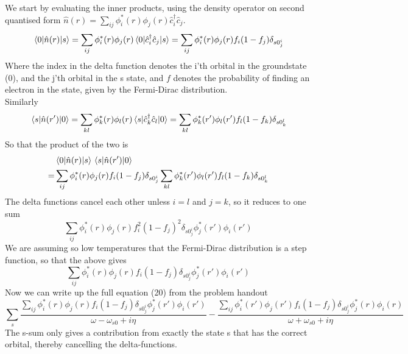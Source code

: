 \begin{solution}
We start by evaluating the inner products, using the density operator on second quantised form $\hat{n}(r) = \sum_{ij} \phi_i^*(r)\phi_j(r)\hat{c}_i^{\dagger}\hat{c}_j$.
\begin{equation}
    \mel{0}{\hat{n}(r)}{s} = \sum_{ij}\phi_i^*(r)\phi_j(r) \mel{0}{\hat{c}_i^{\dagger} \hat{c}_j}{s} =  \sum_{ij}\phi_i^*(r)\phi_j(r) f_i(1-f_j) \delta_{s0_j^i}
\end{equation}
Where the index in the delta function denotes the i'th orbital in the groundstate (0), and the j'th orbital in the s state, and
$f$ denotes the probability of finding an electron in the state, given by the Fermi-Dirac distribution. \\
Similarly
\begin{equation}
    \mel{s}{\hat{n}(r')}{0} = \sum_{kl}\phi_k^*(r)\phi_l(r) \mel{s}{\hat{c}_k^{\dagger} \hat{c}_l}{0} = \sum_{kl} \phi_k^*(r') \phi_l(r') f_l(1-f_k) \delta_{s0_k^l}
\end{equation}
So that the product of the two is
\begin{equation}
\begin{split}
        & \mel{0}{\hat{n}(r)}{s}\mel{s}{\hat{n}(r')}{0} \\
        = & \sum_{ij}\phi_i^*(r)\phi_j(r) f_i(1-f_j) \delta_{s0_j^i} \sum_{kl} \phi_k^*(r') \phi_l(r') f_l(1-f_k) \delta_{s0_k^l}
\end{split}
\end{equation}
The delta functions cancel each other unless $i=l$ and $j=k$, so it reduces to one sum
\begin{equation}
    \sum_{ij} \phi_i^*(r)\phi_j(r) f_i^2(1-f_j)^2 \delta_{s0_j^i} \phi_j^*(r') \phi_i(r') 
\end{equation}
We are assuming so low temperatures that the Fermi-Dirac distribution is a step function, so that the above gives
\begin{equation}
        \sum_{ij} \phi_i^*(r)\phi_j(r) f_i(1-f_j) \delta_{s0_j^i} \phi_j^*(r') \phi_i(r') 
\end{equation}
Now we can write up the full equation (20) from the problem handout
\begin{equation}
    \sum_s \frac{\sum_{ij} \phi_i^*(r)\phi_j(r) f_i(1-f_j) \delta_{s0_j^i} \phi_j^*(r') \phi_i(r') }{\omega - \omega_{s0} + i \eta} - \frac{\sum_{ij} \phi_i^*(r')\phi_j(r') f_i(1-f_j) \delta_{s0_j^i} \phi_j^*(r) \phi_i(r) }{\omega + \omega_{s0} + i \eta}
\end{equation}
The s-sum only gives a contribution from exactly the state s that has the correct orbital, thereby cancelling the delta-functions.

\end{solution}
